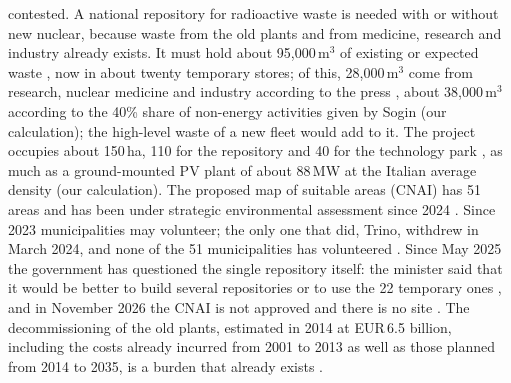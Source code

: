 contested. A national repository for radioactive waste is needed with or without new nuclear, because waste from the old plants and from medicine, research and industry already exists. It must hold about 95{,}000\,m$^3$ of existing or expected waste \citep{SoginBrochure}, now in about twenty temporary stores; of this, 28{,}000\,m$^3$ come from research, nuclear medicine and industry according to the press \citep{IlPost2023}, about 38{,}000\,m$^3$ according to the 40\% share of non-energy activities given by Sogin (our calculation); the high-level waste of a new fleet would add to it. The project occupies about 150\,ha, 110 for the repository and 40 for the technology park \citep{SoginBrochure}, as much as a ground-mounted PV plant of about 88\,MW at the Italian average density (our calculation). The proposed map of suitable areas (CNAI) has 51 areas and has been under strategic environmental assessment since 2024 \citep{SoginVAS2024}. Since 2023 municipalities may volunteer; the only one that did, Trino, withdrew in March 2024, and none of the 51 municipalities has volunteered \citep{IlPost2025}. Since May 2025 the government has questioned the single repository itself: the minister said that it would be better to build several repositories or to use the 22 temporary ones \citep{IlPost2025}, and in November 2026 the CNAI is not approved and there is no site \citep{Teleborsa2026waste}. The decommissioning of the old plants, estimated in 2014 at EUR\,6.5 billion, including the costs already incurred from 2001 to 2013 as well as those planned from 2014 to 2035, is a burden that already exists \citep{Fontani2014}.

